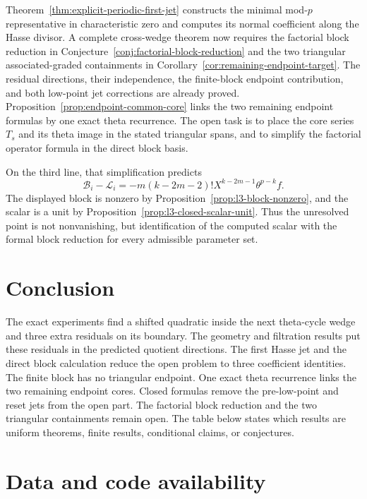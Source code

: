 \documentclass[11pt]{article}
\theoremstyle{remark}
\begin{document}
Theorem~\ref{thm:explicit-periodic-first-jet} constructs the minimal
mod-$p$ representative in characteristic zero and computes its normal
coefficient along the Hasse divisor.  A complete cross-wedge theorem now
requires the factorial block reduction in
Conjecture~\ref{conj:factorial-block-reduction} and the two triangular
associated-graded containments in
Corollary~\ref{cor:remaining-endpoint-target}.  The residual directions,
their independence, the finite-block endpoint contribution, and both
low-point jet corrections are already proved.
Proposition~\ref{prop:endpoint-common-core} links the two remaining endpoint
formulas by one exact theta recurrence.  The open task is to place the core
series $T_s$ and its theta image in the stated triangular spans, and to
simplify the factorial operator formula in the direct block basis.

On the third line, that simplification predicts
\[
 \mathcal B_i-\mathcal L_i
 =-m(k-2m-2)!
 X^{k-2m-1}\theta^{p-k}f.
\]
The displayed block is nonzero by
Proposition~\ref{prop:l3-block-nonzero}, and the scalar is a unit by
Proposition~\ref{prop:l3-closed-scalar-unit}.  Thus the unresolved point is
not nonvanishing, but identification of the computed scalar with the formal
block reduction for every admissible parameter set.

\section{Conclusion}

The exact experiments find a shifted quadratic inside the next theta-cycle
wedge and three extra residuals on its boundary.  The geometry and filtration
results put these residuals in the predicted quotient directions.  The first
Hasse jet and the direct block calculation reduce the open problem to three
coefficient identities.  The finite block has no triangular endpoint.  One
exact theta recurrence links the two remaining endpoint cores.  Closed
formulas remove the pre-low-point and reset jets from the open part.  The
factorial block reduction and the two triangular containments remain open.
The table below states which results are uniform theorems, finite results,
conditional claims, or conjectures.

\clearpage


\appendix


\section*{Data and code availability}
\end{document}
